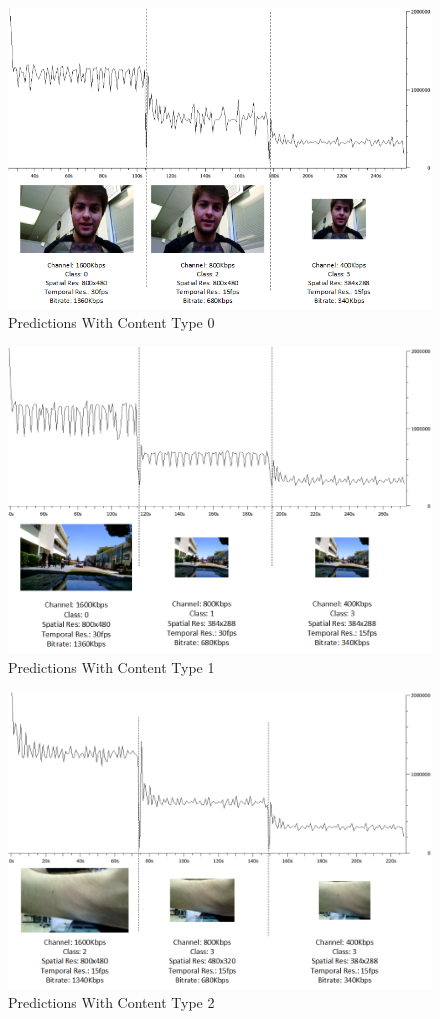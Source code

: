 \documentclass[3p,times,procedia]{elsarticle}
\begin{document}
\begin{figure}[H]
\centering
\includegraphics[width=0.8\linewidth]{TrainingExperimentTalkingHead.png}
\caption{Predictions With Content Type 0}
\label{fig:TalkingHead}
\end{figure}
\begin{figure}[H]
\centering
\includegraphics[width=0.8\linewidth]{TrainingExperimentSports.png}
\caption{Predictions With Content Type 1}
\label{fig:Sports}
\end{figure}
\begin{figure}[H]
\centering
\includegraphics[width=0.8\linewidth]{TrainingExperimentMedical.png}
\caption{Predictions With Content Type 2}
\label{fig:Medical}
\end{figure}
\end{document}
